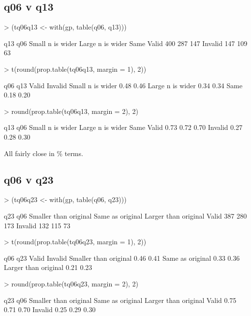 \documentclass[11pt]{article}
\begin{document}
\subsection{q06 v q13}
\label{sec-2-2}
\begin{Schunk}
\begin{Sinput}
> (tq06q13 <- with(gp, table(q06, q13)))
\end{Sinput}
\begin{Soutput}
         q13
q06       Small n is wider Large n is wider Same
  Valid                400              287  147
  Invalid              147              109   63
\end{Soutput}
\begin{Sinput}
> t(round(prop.table(tq06q13, margin = 1), 2))
\end{Sinput}
\begin{Soutput}
                  q06
q13                Valid Invalid
  Small n is wider  0.48    0.46
  Large n is wider  0.34    0.34
  Same              0.18    0.20
\end{Soutput}
\begin{Sinput}
> round(prop.table(tq06q13, margin = 2), 2)
\end{Sinput}
\begin{Soutput}
         q13
q06       Small n is wider Large n is wider Same
  Valid               0.73             0.72 0.70
  Invalid             0.27             0.28 0.30
\end{Soutput}
\end{Schunk}

All fairly close in \% terms.
\subsection{q06 v q23}
\label{sec-2-3}
\begin{Schunk}
\begin{Sinput}
> (tq06q23 <- with(gp, table(q06, q23)))
\end{Sinput}
\begin{Soutput}
         q23
q06       Smaller than original Same as original Larger than original
  Valid                     387              280                  173
  Invalid                   132              115                   73
\end{Soutput}
\begin{Sinput}
> t(round(prop.table(tq06q23, margin = 1), 2))
\end{Sinput}
\begin{Soutput}
                       q06
q23                     Valid Invalid
  Smaller than original  0.46    0.41
  Same as original       0.33    0.36
  Larger than original   0.21    0.23
\end{Soutput}
\begin{Sinput}
> round(prop.table(tq06q23, margin = 2), 2)
\end{Sinput}
\begin{Soutput}
         q23
q06       Smaller than original Same as original Larger than original
  Valid                    0.75             0.71                 0.70
  Invalid                  0.25             0.29                 0.30
\end{Soutput}
\end{Schunk}
\end{document}

